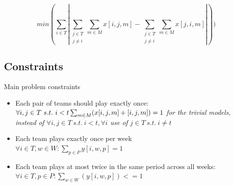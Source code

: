 \documentclass{article}
\begin{document}



\[min(\sum_{i \in T }\left|\sum_{\substack{j \in T \\ j \neq i}}\sum_{m \in M}x[i,j,m] - \sum_{\substack{j \in T \\ j \neq i}}\sum_{m \in M}x[j,i,m] \right|))\]





\subsection{Constraints}

Main problem constraints
\begin{itemize}
    \item [\textbf{1.}] Each pair of teams should play exactly once:\\
$\forall i,j \in T \ s.t. \ i< t \\ \sum_{m \in M}(x[i,j,m]+[i,j,m])=1   $
\textit{\small{for the trivial models, instead of  $\forall i,j \in T \ s.t. \ i< t,  \forall i$ use of $j \in T \ s.t. \ i \neq t$}}
\item [\textbf{2.}] Each team plays exactly once per week\\
$\forall i \in T, w \in W : \sum_{p \in P} y[i,w,p] = 1$


\item [\textbf{3.}] Each team plays at most twice in the same period across all weeks:\\
$ \forall i \in T ,p \in P :\sum_{w \in W}(y[i,w,p])<=1  $
\end{itemize}
\end{document}
